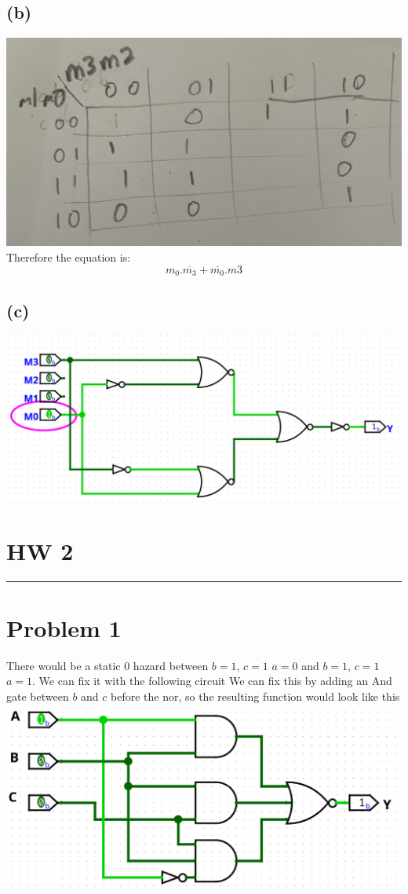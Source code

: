 \documentclass[12pt]{article}
\begin{document}
\subsection*{(b)}
\includegraphics[scale=0.15]{Problem7Kmap.jpg}\\
Therefore the equation is:
$$\boxed{m_0.\overline{m_3}+\overline{m_0}.m3}$$
\subsection*{(c)}
\includegraphics[scale=0.25]{Problem7Partc.png}
\section*{HW 2}
\noindent\rule{15cm}{1pt}
\section*{Problem 1}
There would be a static 0 hazard between $b=1$, $c=1$ $a=0$ and $b=1$, $c=1$ $a=1$. We can fix it with the following circuit
We can fix this by adding an And gate between $b$ and $c$ before the nor, so the resulting function would look like this
\includegraphics[scale=0.25]{Problem1.png}
\end{document}

